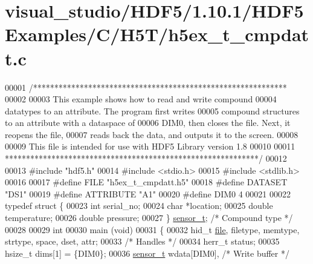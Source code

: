 \hypertarget{visual__studio_2_h_d_f5_21_810_81_2_h_d_f5_examples_2_c_2_h5_t_2h5ex__t__cmpdatt_8c_source}{}\section{visual\+\_\+studio/\+H\+D\+F5/1.10.1/\+H\+D\+F5\+Examples/\+C/\+H5\+T/h5ex\+\_\+t\+\_\+cmpdatt.c}
\label{visual__studio_2_h_d_f5_21_810_81_2_h_d_f5_examples_2_c_2_h5_t_2h5ex__t__cmpdatt_8c_source}

\begin{DoxyCode}
00001 \textcolor{comment}{/************************************************************}
00002 \textcolor{comment}{}
00003 \textcolor{comment}{  This example shows how to read and write compound}
00004 \textcolor{comment}{  datatypes to an attribute.  The program first writes}
00005 \textcolor{comment}{  compound structures to an attribute with a dataspace of}
00006 \textcolor{comment}{  DIM0, then closes the file.  Next, it reopens the file,}
00007 \textcolor{comment}{  reads back the data, and outputs it to the screen.}
00008 \textcolor{comment}{}
00009 \textcolor{comment}{  This file is intended for use with HDF5 Library version 1.8}
00010 \textcolor{comment}{}
00011 \textcolor{comment}{ ************************************************************/}
00012 
00013 \textcolor{preprocessor}{#include "hdf5.h"}
00014 \textcolor{preprocessor}{#include <stdio.h>}
00015 \textcolor{preprocessor}{#include <stdlib.h>}
00016 
00017 \textcolor{preprocessor}{#define FILE            "h5ex\_t\_cmpdatt.h5"}
00018 \textcolor{preprocessor}{#define DATASET         "DS1"}
00019 \textcolor{preprocessor}{#define ATTRIBUTE       "A1"}
00020 \textcolor{preprocessor}{#define DIM0            4}
00021 
00022 \textcolor{keyword}{typedef} \textcolor{keyword}{struct }\{
00023     \textcolor{keywordtype}{int}     serial\_no;
00024     \textcolor{keywordtype}{char}    *location;
00025     \textcolor{keywordtype}{double}  temperature;
00026     \textcolor{keywordtype}{double}  pressure;
00027 \} \hyperlink{structsensor__t}{sensor\_t};                                 \textcolor{comment}{/* Compound type */}
00028 
00029 \textcolor{keywordtype}{int}
00030 main (\textcolor{keywordtype}{void})
00031 \{
00032     hid\_t       \hyperlink{structfile}{file}, filetype, memtype, strtype, space, dset, attr;
00033                                             \textcolor{comment}{/* Handles */}
00034     herr\_t      status;
00035     hsize\_t     dims[1] = \{DIM0\};
00036     \hyperlink{structsensor__t}{sensor\_t}    wdata[DIM0],                \textcolor{comment}{/* Write buffer */}

\end{DoxyCode}
